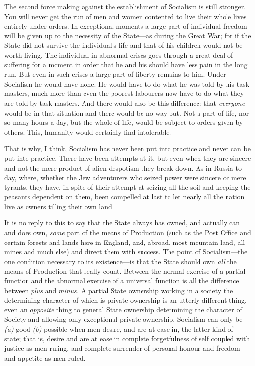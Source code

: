 \documentclass{book}
\begin{document}
The second force making against the establishment of Socialism is still stronger. You will never get the run of men and women contented to live their whole lives entirely under orders. In exceptional moments a large part of individual freedom will be given up to the necessity of the State—as during the Great War; for if the State did not survive the individual’s life and that of his children would not be worth living. The individual in abnormal crises goes through a great deal of suffering for a moment in order that he and his should have less pain in the long run. But even in such crises a large part of liberty remains to him. Under Socialism he would have none. He would have to do what he was told by his task-masters, much more than even the poorest labourers now have to do what they are told by task-masters. And there would also be this difference: that \emph{everyone} would be in that situation and there would be no way out. Not a part of life, nor so many hours a day, but the whole of life, would be subject to orders given by others. This, humanity would certainly find intolerable.

That is why, I think, Socialism has never been put into practice and never can be put into practice. There have been attempts at it, but even when they are sincere and not the mere product of alien despotism they break down. As in Russia to-day, where, whether the Jew adventurers who seized power were sincere or mere tyrants, they have, in spite of their attempt at seizing all the soil and keeping the peasants dependent on them, been compelled at last to let nearly all the nation live as owners tilling their own land.

It is no reply to this to say that the State always has owned, and actually can and does own, \emph{some} part of the means of Production (such as the Post Office and certain forests and lands here in England, and, abroad, most mountain land, all mines and much else) and direct them with success. The point of Socialism—the one condition necessary to its existence—is that the State should own \emph{all} the means of Production that really count. Between the normal exercise of a partial function and the abnormal exercise of a universal function is all the difference between \emph{plus} and \emph{minus.} A partial State ownership working in a society the determining character of which is private ownership is an utterly different thing, even an \emph{opposite} thing to general State ownership determining the character of Society and allowing only exceptional private ownership. Socialism can only be \emph{(a)} good \emph{(b)} possible when men desire, and are at ease in, the latter kind of state; that is, desire and are at ease in complete forgetfulness of self coupled with justice as men ruling, and complete surrender of personal honour and freedom and appetite as men ruled.
\end{document}
